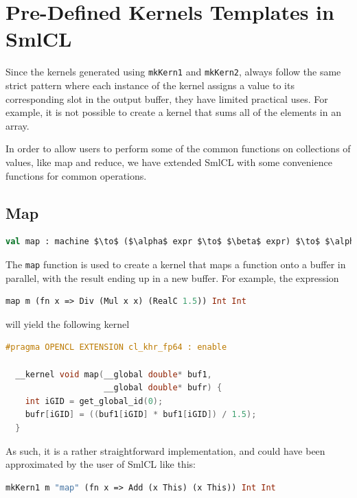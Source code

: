 \section{Pre-Defined Kernels Templates in SmlCL}

Since the kernels generated using \texttt{mkKern1} and
\texttt{mkKern2}, always follow the same strict pattern where each
instance of the kernel assigns a value to its corresponding slot in
the output buffer, they have limited practical uses. For example, it
is not possible to create a kernel that sums all of the elements in an
array.

In order to allow users to perform some of the common functions on
collections of values, like map and reduce, we have extended SmlCL
with some convenience functions for common operations.

\subsection{Map}

\begin{lstlisting}[language=ML,mathescape,caption=Signature for \texttt{map}]
val map : machine $\to$ ($\alpha$ expr $\to$ $\beta$ expr) $\to$ $\alpha$ T $\to$ $\beta$ T $\to$ ($\alpha$, $\beta$)kern1
\end{lstlisting}

The \texttt{map} function is used to create a kernel that maps a
function onto a buffer in parallel, with the result ending up in a new
buffer. For example, the expression
\begin{lstlisting}[language=ML,label=mapkern,caption=Sample call to \texttt{map}]
  map m (fn x => Div (Mul x x) (RealC 1.5)) Int Int
\end{lstlisting}
will yield the following kernel
\begin{lstlisting}[language=C,label=vectoradd,caption=Resulting kernel
  from the call in listing \ref{mapkern}.]
  #pragma OPENCL EXTENSION cl_khr_fp64 : enable
  
  __kernel void map(__global double* buf1,
                    __global double* bufr) {
    int iGID = get_global_id(0);
    bufr[iGID] = ((buf1[iGID] * buf1[iGID]) / 1.5);
  }
\end{lstlisting}

As such, it is a rather straightforward implementation, and could have
been approximated by the user of SmlCL like this:

\begin{lstlisting}[language=ML,caption=Approximation of \texttt{map}
    function.]
  mkKern1 m "map" (fn x => Add (x This) (x This)) Int Int
\end{lstlisting}

